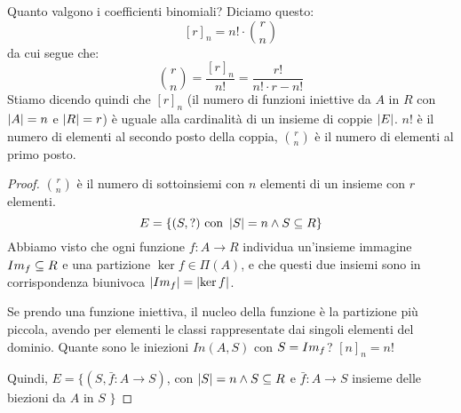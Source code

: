 
\begin{prop}
Quanto valgono i coefficienti binomiali? Diciamo questo:
\[
[r]_n = n! \cdot \binom{r}{n}
\]
da cui segue che:
\[
\binom{r}{n} = \frac{[r]_n}{n!} = \frac{r!}{n! \cdot {r-n}!}
\]
Stiamo dicendo quindi che $[r]_n$ (il numero di funzioni iniettive da $A$ in $R$ con $\left\lvert{A}\right\rvert = n$ e $\left\lvert{R}\right\rvert = r$) \`e uguale alla cardinalit\`a di un insieme di coppie $\left\lvert{E}\right\rvert$. $n!$ \`e il numero di elementi al secondo posto della coppia, $\binom{r}{n}$ \`e il numero di elementi al primo posto.
\end{prop}
\begin{proof}
$\binom{r}{n}$ \`e il numero di sottoinsiemi con $n$ elementi di un insieme con $r$ elementi.
\[
E = \{ (S, ?) \text{ con } \left\lvert{S}\right\rvert = n \land S \subseteq R \}
\]
Abbiamo visto che ogni funzione $f : A \to R$ individua un'insieme immagine $Im_{f} \subseteq R$ e una partizione $\ker f \in \Pi(A)$, e che questi due insiemi sono in corrispondenza biunivoca $\left\lvert{Im_{f}}\right\rvert = \left\lvert{\ker f}\right\rvert$.

Se prendo una funzione iniettiva, il nucleo della funzione \`e la partizione pi\`u piccola, avendo per elementi le classi rappresentate dai singoli elementi del dominio. Quante sono le iniezioni $In(A, S)$ con $S = Im_{f}$? $[n]_n = n!$

Quindi, $ E = \{ (S, \bar f : A \to S) $, con $ \left\lvert{S}\right\rvert = n \land S \subseteq R $ e $\bar f : A \to S$ insieme delle biezioni da $A$ in $S$ $\}$
\end{proof}

